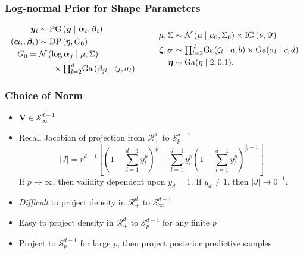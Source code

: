 \documentclass[aspectratio=169]{beamer}
\begin{document}
\begin{frame}
  \frametitle{Log-normal Prior for Shape Parameters}
  \begin{equation*}
    \begin{aligned}
      \bm{ y}_i &\sim \text{PG}\left(\bm{ y}\mid \bm{ \alpha}_i, \bm{\beta}_i\right)\\
      (\bm{\alpha}_i, \bm{\beta}_i) &\sim \text{DP}\left(\eta, G_0\right)\\
        &~\hspace{-1cm}G_0 = \mathcal{N}\left(\log\bm{ \alpha}_{j}\mid\mu,\Sigma\right)\\
        &~\hspace{0.5cm}\times
            {\textstyle\prod}_{l = 2}^d\text{Ga}\left(\beta_{jl}\mid\zeta_l,\sigma_l\right)
    \end{aligned}
    \hspace{1cm}
    \begin{aligned}
      \mu,\Sigma &\sim \mathcal{N}\left(\mu\mid\mu_0,\Sigma_0\right)
                                  \times \text{IG}\left(\nu,\Psi\right)\\
      \bm{ \zeta},\bm{\sigma} &\sim {\textstyle\prod}_{l = 2}^d\text{Ga}(\zeta_l \mid a,b)
                                \times \text{Ga}(\sigma_l \mid c,d) \\
      \bm{ \eta} &\sim \text{Ga}(\eta \mid 2, 0.1).
    \end{aligned}
  \end{equation*}
\end{frame}

\begin{frame}
  \frametitle{Choice of Norm}
  \begin{itemize}
    \item $\bm{V} \in \mathcal{S}_{\infty}^{d-1}$
    \pause
    \item Recall Jacobian of projection from $\mathcal{R}_+^d$ to $\mathcal{S}_{p}^{d-1}$
    \begin{equation*}
        \lvert J \rvert = r^{d-1}\left[\left(1 - {\textstyle\sum}_{l = 1}^{d-1}y_l^p\right)^{\frac{1}{p}} +
        {\textstyle\sum}_{l = 1}^{d-1}y_l^p\left(1 - {\textstyle\sum}_{l=1}^{d-1}
              y_l^p\right)^{\frac{1}{p} - 1}\right]
    \end{equation*}
    \pause
    If $p\to\infty$, then validity dependent upon $y_d = 1$.  If $y_d\neq 1$, then $\lvert J \rvert \to 0^{-1}$.
    \pause
    \item \emph{Difficult} to project density in $\mathcal{R}_+^{d}$ to $\mathcal{S}_{\infty}^{d-1}$
    \pause
    \item Easy to project density in $\mathcal{R}_+^{d}$ to $\mathcal{S}_{p}^{d-1}$ for any finite $p$
    \pause
    \item Project to $\mathcal{S}_{p}^{d-1}$ for large $p$, then project posterior predictive samples
  \end{itemize}
\end{frame}
\end{document}
